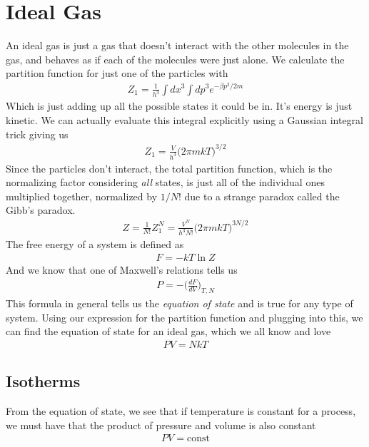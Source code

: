\section{Ideal Gas}
An ideal gas is just a gas that doesn't interact with the other molecules in the gas, and behaves as if each of the molecules were just alone. We calculate the partition function for just one of the particles with
\begin{align}
    Z_1 = \frac{1}{h^3}\int dx^3 \int dp^3 e^{-\beta p^2/2m}
\end{align}
Which is just adding up all the possible states it could be in. It's energy is just kinetic. We can actually evaluate this integral explicitly using a Gaussian integral trick giving us
\begin{align}
    Z_1 = \frac{V}{h^3}\Big(2\pi m kT\Big)^{3/2}
\end{align}
Since the particles don't interact, the total partition function, which is the normalizing factor considering \emph{all} states, is just all of the individual ones multiplied together, normalized by $1/N!$ due to a strange paradox called the Gibb's paradox.
\begin{align}
    Z = \frac{1}{N!} Z_1^N = \frac{V^N}{h^3N!}\Big(2\pi m kT\Big)^{3N/2}
\end{align}
The free energy of a system is defined as 
\begin{align}
    F = -kT\ln Z
\end{align}
And we know that one of Maxwell's relations tells us 
\begin{align}
    P = -\Big(\frac{dF}{dV}\Big)_{T,N}
\end{align}
This formula in general tells us the \emph{equation of state} and is true for any type of system. Using our expression for the partition function and plugging into this, we can find the equation of state for an ideal gas, which we all know and love
\begin{align}
    PV = NkT
\end{align}
\subsection{Isotherms}
From the equation of state, we see that if temperature is constant for a process, we must have that the product of pressure and volume is also constant
\begin{align}
    PV = \textrm{const}
\end{align}

